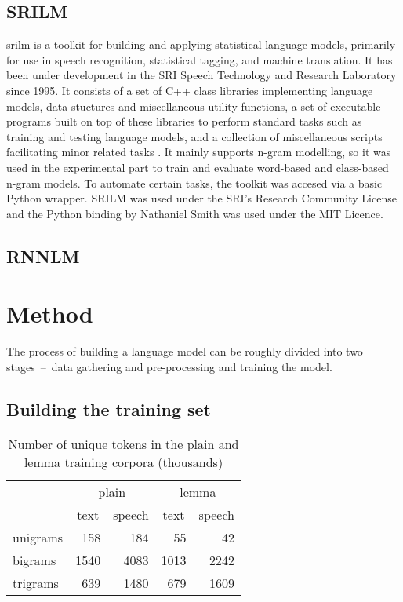 \subsection{SRILM}
\gls{srilm} is a toolkit for building and applying statistical language models, primarily for use in speech recognition, statistical tagging, and machine translation. It has been under development in the SRI Speech Technology and Research Laboratory since 1995. It consists of a set of C++ class libraries implementing language models, data stuctures and miscellaneous utility functions, a set of executable programs built on top of these libraries to perform standard tasks such as training and testing language models, and a collection of miscellaneous scripts facilitating minor related tasks \cite{stolcke2011srilm}. It mainly supports n-gram modelling, so it was used in the experimental part to train and evaluate word-based and class-based n-gram models. To automate certain tasks, the toolkit was accesed via a basic Python wrapper. SRILM was used under the SRI's Research Community License and the Python binding by Nathaniel Smith was used under the MIT Licence.
\subsection{RNNLM}
\section{Method}
The process of building a language model can be roughly divided into two stages~--~data gathering and pre-processing and training the model.
\subsection{Building the training set}
\label{subsection:trainingset}

\begin{table}[!htbp]
	\centering
	\caption{Number of unique tokens in the plain and lemma training corpora (thousands)}
	\begin{tabular*}{.6\linewidth}{@{\extracolsep{\fill}}l*4r}
		{}        &  \multicolumn{2}{c}{plain} & \multicolumn{2}{c}{lemma}\\
		\cmidrule{2-5}
		{}        &  \multicolumn{1}{c}{text} & \multicolumn{1}{c}{speech} & \multicolumn{1}{c}{text} & \multicolumn{1}{c}{speech} \\
		\cmidrule{2-5}
		unigrams  &  158  & 184    & 55   & 42    \\
	        bigrams   &  1540 & 4083   & 1013 & 2242   \\
                trigrams  &  639  & 1480   & 679  & 1609   \\
	\end{tabular*}
\end{table}

